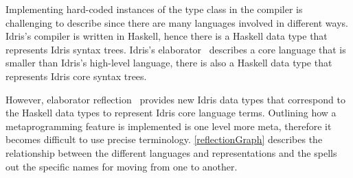 Implementing hard-coded instances of the \Editorable{} type class in the
compiler is challenging to describe since there are many languages involved in
different ways. Idris's compiler is written in Haskell, hence there is a
Haskell data type that represents Idris syntax trees. Idris's
elaborator~\citep{idris} describes a core language that is smaller than Idris's
high-level language, there is also a Haskell data type that represents Idris
core syntax trees.

However, elaborator reflection~\citep{davidphd, elabref} provides new Idris
data types that correspond to the Haskell data types to represent Idris core
language terms.
Outlining how a metaprogramming feature is implemented is one level more meta,
therefore it becomes difficult to use precise terminology.
\autoref{reflectionGraph} describes the relationship between the different
languages and representations and the spells out the specific names for moving
from one to another.


